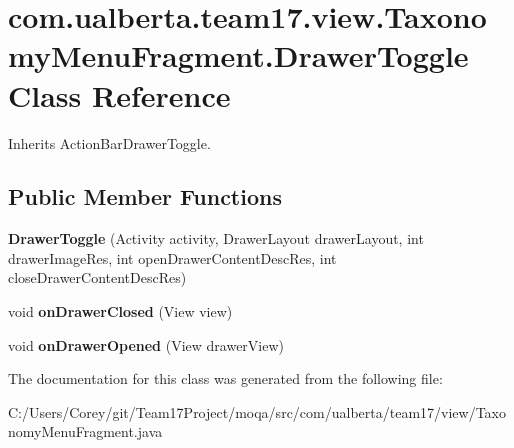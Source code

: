 \hypertarget{classcom_1_1ualberta_1_1team17_1_1view_1_1_taxonomy_menu_fragment_1_1_drawer_toggle}{\section{com.\+ualberta.\+team17.\+view.\+Taxonomy\+Menu\+Fragment.\+Drawer\+Toggle Class Reference}
\label{classcom_1_1ualberta_1_1team17_1_1view_1_1_taxonomy_menu_fragment_1_1_drawer_toggle}
}


Inherits Action\+Bar\+Drawer\+Toggle.

\subsection*{Public Member Functions}
\begin{DoxyCompactItemize}
\item 
\hypertarget{classcom_1_1ualberta_1_1team17_1_1view_1_1_taxonomy_menu_fragment_1_1_drawer_toggle_a81725633c1581586f2efd0b90848936e}{{\bfseries Drawer\+Toggle} (Activity activity, Drawer\+Layout drawer\+Layout, int drawer\+Image\+Res, int open\+Drawer\+Content\+Desc\+Res, int close\+Drawer\+Content\+Desc\+Res)}\label{classcom_1_1ualberta_1_1team17_1_1view_1_1_taxonomy_menu_fragment_1_1_drawer_toggle_a81725633c1581586f2efd0b90848936e}

\item 
\hypertarget{classcom_1_1ualberta_1_1team17_1_1view_1_1_taxonomy_menu_fragment_1_1_drawer_toggle_a8f669bab00a29ebdc4fcf35e9a11b01c}{void {\bfseries on\+Drawer\+Closed} (View view)}\label{classcom_1_1ualberta_1_1team17_1_1view_1_1_taxonomy_menu_fragment_1_1_drawer_toggle_a8f669bab00a29ebdc4fcf35e9a11b01c}

\item 
\hypertarget{classcom_1_1ualberta_1_1team17_1_1view_1_1_taxonomy_menu_fragment_1_1_drawer_toggle_a514eb385d8e4aae7fe1f2d1e4e592115}{void {\bfseries on\+Drawer\+Opened} (View drawer\+View)}\label{classcom_1_1ualberta_1_1team17_1_1view_1_1_taxonomy_menu_fragment_1_1_drawer_toggle_a514eb385d8e4aae7fe1f2d1e4e592115}

\end{DoxyCompactItemize}


The documentation for this class was generated from the following file\+:\begin{DoxyCompactItemize}
\item 
C\+:/\+Users/\+Corey/git/\+Team17\+Project/moqa/src/com/ualberta/team17/view/Taxonomy\+Menu\+Fragment.\+java\end{DoxyCompactItemize}
